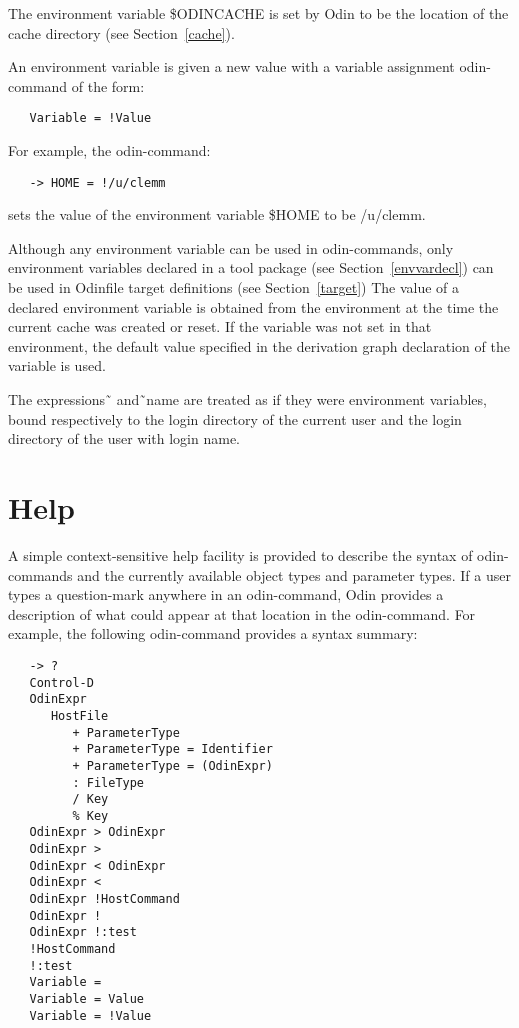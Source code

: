 The environment variable {\ex \$ODINCACHE} is set by Odin to be the location
of the cache directory (see Section~\ref{cache}).

An environment variable is given a new value
with a variable assignment odin-command of the form:
\begin{verbatim}
   Variable = !Value
\end{verbatim}
For example, the odin-command:
\begin{verbatim}
   -> HOME = !/u/clemm
\end{verbatim}
sets the value of the environment variable {\ex \$HOME} to be {\ex /u/clemm}.

Although any environment variable can be used in odin-commands,
only environment variables declared in a tool package 
(see Section~\ref{envvardecl}) can be used in
{\ex Odinfile} target definitions (see Section~\ref{target})
The value of a declared environment variable is obtained from the
environment at the time the current cache was created or reset.
If the variable was not set in that environment,
the default value specified in the derivation graph declaration
of the variable is used.

The expressions {\ex \~\,} and {\ex \~\,name} are treated as if they were
environment variables, bound respectively to the login directory of the current
user and the login directory of the user with login {\ex name}.


\section{Help}
\label{help}

A simple context-sensitive help facility is provided
to describe the syntax of odin-commands
and the currently available object types and parameter types.
If a user types a question-mark anywhere in an odin-command,
Odin provides a description of what could appear at that location
in the odin-command.
For example, the following odin-command provides a syntax summary:
\begin{verbatim}
   -> ?
   Control-D
   OdinExpr
      HostFile
         + ParameterType
         + ParameterType = Identifier
         + ParameterType = (OdinExpr)
         : FileType
         / Key
         % Key
   OdinExpr > OdinExpr
   OdinExpr >
   OdinExpr < OdinExpr
   OdinExpr <
   OdinExpr !HostCommand
   OdinExpr !
   OdinExpr !:test
   !HostCommand
   !:test
   Variable =
   Variable = Value
   Variable = !Value
\end{verbatim}


